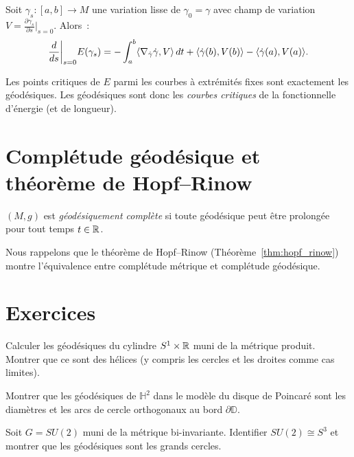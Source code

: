 \begin{theoreme}
Soit $\gamma_s : [a,b] \to M$ une variation lisse de $\gamma_0 = \gamma$ avec
champ de variation $V = \frac{\partial\gamma_s}{\partial s}\big|_{s=0}$. Alors~:
\[
    \frac{d}{ds}\bigg|_{s=0} E(\gamma_s) = -\int_a^b \langle \nabla_{\dot\gamma}\dot\gamma, V \rangle\, dt
    + \langle \dot\gamma(b), V(b) \rangle - \langle \dot\gamma(a), V(a) \rangle.
\]
\end{theoreme}

\begin{corollaire}
Les points critiques de $E$ parmi les courbes \`a extr\'emit\'es fixes sont exactement
les g\'eod\'esiques. Les g\'eod\'esiques sont donc les \emph{courbes critiques}
de la fonctionnelle d'\'energie (et de longueur).
\end{corollaire}

\section{Compl\'etude g\'eod\'esique et th\'eor\`eme de Hopf--Rinow}

\begin{definition}
$(M, g)$ est \emph{g\'eod\'esiquement compl\`ete} si toute g\'eod\'esique peut \^etre
prolong\'ee pour tout temps $t \in \mathbb{R}$.
\end{definition}

Nous rappelons que le th\'eor\`eme de Hopf--Rinow (Th\'eor\`eme~\ref{thm:hopf_rinow})
montre l'\'equivalence entre compl\'etude m\'etrique et compl\'etude g\'eod\'esique.

\section{Exercices}

\begin{exercice}
Calculer les g\'eod\'esiques du cylindre $S^1 \times \mathbb{R}$ muni de la m\'etrique produit.
Montrer que ce sont des h\'elices (y compris les cercles et les droites comme cas
limites).
\end{exercice}

\begin{exercice}
Montrer que les g\'eod\'esiques de $\mathbb{H}^2$ dans le mod\`ele du disque de
Poincar\'e sont les diam\`etres et les arcs de cercle orthogonaux au bord $\partial\mathbb{D}$.
\end{exercice}

\begin{exercice}
Soit $G = SU(2)$ muni de la m\'etrique bi-invariante. Identifier $SU(2) \cong S^3$
et montrer que les g\'eod\'esiques sont les grands cercles.
\end{exercice}

